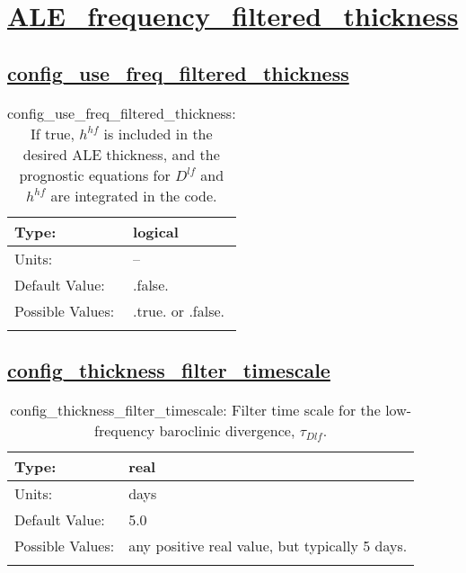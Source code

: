 \section[ALE\_frequency\_filtered\_thickness]{\hyperref[sec:nm_tab_ALE_frequency_filtered_thickness]{ALE\_frequency\_filtered\_thickness}}
\label{sec:nm_sec_ALE_frequency_filtered_thickness}
\subsection[config\_use\_freq\_filtered\_thickness]{\hyperref[sec:nm_tab_ALE_frequency_filtered_thickness]{config\_use\_freq\_filtered\_thickness}}
\label{subsec:nm_sec_config_use_freq_filtered_thickness}
\begin{center}
\begin{longtable}{| p{2.0in} || p{4.0in} |}
    \hline
    Type: & logical \\
    \hline
    Units: & -- \\
    \hline
    Default Value: & .false. \\
    \hline
    Possible Values: & .true. or .false. \\
    \hline
    \caption{config\_use\_freq\_filtered\_thickness: If true, $h^{hf}$ is included in the desired ALE thickness, and the prognostic equations for $D^{lf}$ and $h^{hf}$ are integrated in the code.}
\end{longtable}
\end{center}
\subsection[config\_thickness\_filter\_timescale]{\hyperref[sec:nm_tab_ALE_frequency_filtered_thickness]{config\_thickness\_filter\_timescale}}
\label{subsec:nm_sec_config_thickness_filter_timescale}
\begin{center}
\begin{longtable}{| p{2.0in} || p{4.0in} |}
    \hline
    Type: & real \\
    \hline
    Units: & \si{days} \\
    \hline
    Default Value: & 5.0 \\
    \hline
    Possible Values: & any positive real value, but typically 5 days. \\
    \hline
    \caption{config\_thickness\_filter\_timescale: Filter time scale for the low-frequency baroclinic divergence, $\tau_{Dlf}$.}
\end{longtable}
\end{center}
